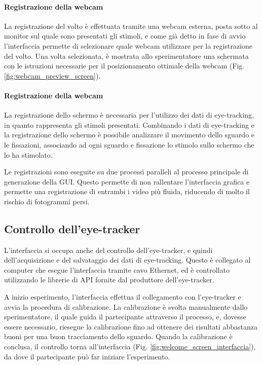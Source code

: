 \paragraph{Registrazione della webcam}
La registrazione del volto è effettuata tramite una webcam esterna, posta sotto al monitor sul quale sono presentati gli stimoli, e come già detto in fase di avvio l'interfaccia permette di selezionare quale webcam utilizzare per la registrazione del volto. Una volta selezionata, è mostrata allo sperimentatore una schermata con le istruzioni necessarie per il posizionamento ottimale della webcam (Fig. \ref{fig:webcam_preview_screen}).

\paragraph{Registrazione della webcam}
La registrazione dello schermo è necessaria per l'utilizzo dei dati di eye-tracking, in quanto rappresenta gli stimoli presentati. Combinando i dati di eye-tracking e la registrazione dello schermo è possibile analizzare il movimento dello sguardo e le fissazioni, associando ad ogni sguardo e fissazione lo stimolo sullo schermo che lo ha stimolato.

Le registrazioni sono eseguite su due processi paralleli al processo principale di generazione della GUI. Questo permette di non rallentare l'interfaccia grafica e permette una registrazione di entrambi i video più fluida, riducendo di molto il rischio di fotogrammi persi.

\subsection{Controllo dell'eye-tracker}

L'interfaccia si occupa anche del controllo dell'eye-tracker, e quindi dell'acquisizione e del salvataggio dei dati di eye-tracking. Questo è collegato al computer che esegue l'interfaccia tramite cavo Ethernet, ed è controllato utilizzando le librerie di API fornite dal produttore dell'eye-tracker.

A inizio esperimento, l'interfaccia effettua il collegamento con l'eye-tracker e avvia la procedura di calibrazione. La calibrazione è svolta manualmente dallo sperimentatore, il quale guida il partecipante attraverso il processo, e, dovesse essere necessario, riesegue la calibrazione fino ad ottenere dei risultati abbastanza buoni per una buon tracciamento dello sguardo. Quando la calibrazione è conclusa, il controllo torna all'interfaccia (Fig. \ref{fig:welcome_screen_interfaccia}), da dove il partecipante può far iniziare l'esperimento.

